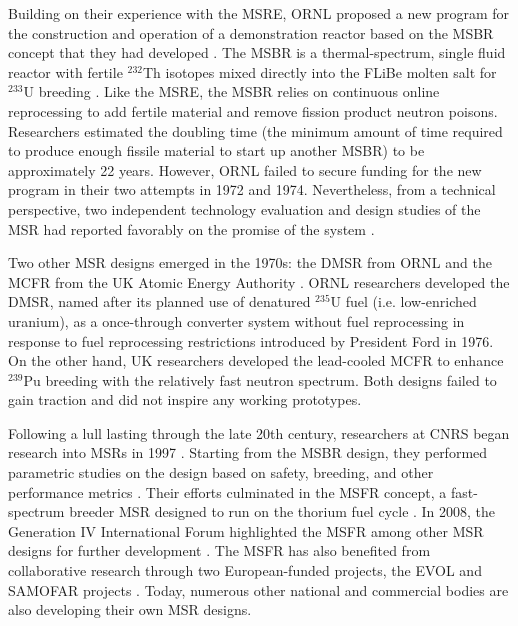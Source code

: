 Building on their experience with the \gls{MSRE}, \gls{ORNL} proposed a
new program for the construction and operation of a demonstration reactor
based on the \gls{MSBR} concept that they had
developed \cite{macpherson_molten_1985}. The \gls{MSBR} is a thermal-spectrum,
single fluid reactor with fertile $^{232}$Th isotopes mixed directly into the
FLiBe molten salt for $^{233}$U breeding \cite{gehin_liquid_2016}. Like the
\gls{MSRE}, the \gls{MSBR} relies on continuous online reprocessing to add
fertile material and remove fission product neutron poisons. Researchers
estimated the doubling time (the minimum amount of time required to produce
enough fissile material to start up another \gls{MSBR}) to be
approximately 22 years. However, \gls{ORNL} failed to secure funding for the
new program in their two attempts in 1972 and 1974. Nevertheless, from a
technical perspective, two independent
technology evaluation and design studies of the \gls{MSR} had reported
favorably on the promise of the system \cite{macpherson_molten_1985}.

Two other \gls{MSR} designs emerged in the 1970s: the \gls{DMSR} from
\gls{ORNL} \cite{gehin_liquid_2016} and the \gls{MCFR} from the UK Atomic
Energy Authority \cite{smith_assessment_1974}. \gls{ORNL}
researchers developed the \gls{DMSR}, named after its planned use of denatured
$^{235}$U fuel (i.e. low-enriched uranium), as a once-through converter system
without fuel reprocessing in response to fuel reprocessing restrictions
introduced by President Ford in 1976. On the other hand, UK researchers
developed the lead-cooled \gls{MCFR} to enhance $^{239}$Pu breeding with the
relatively fast neutron spectrum. Both designs failed to gain traction and did
not inspire any working prototypes.

Following a lull lasting through the late 20th century, researchers at
\gls{CNRS} began research into \glspl{MSR} in 1997
\cite{heuer_simulation_2010}. Starting from the \gls{MSBR} design, they
performed parametric studies on the design based on safety, breeding, and
other performance metrics \cite{mathieu_thorium_2006}. Their efforts
culminated in the \gls{MSFR} concept, a fast-spectrum breeder \gls{MSR}
designed to run on the thorium fuel cycle \cite{merle_optimized_2007}. In
2008, the Generation IV International Forum highlighted the \gls{MSFR} among
other \gls{MSR} designs for further development \cite{gif_generation_2008}.
The \gls{MSFR} has also benefited from collaborative research through two
European-funded projects, the EVOL and SAMOFAR projects
\cite{euratom_final_2015}. Today, numerous other national and commercial
bodies are also developing their own \gls{MSR} designs.

